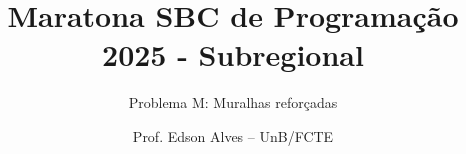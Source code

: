 \title{Maratona SBC de Programação 2025 - Subregional}
\subtitle{Problema M: Muralhas reforçadas}
\author{Prof. Edson Alves -- UnB/FCTE}
\date{}

